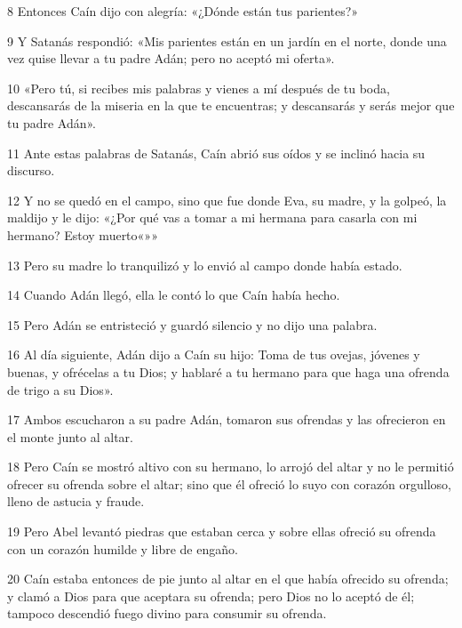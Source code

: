 \par 8 Entonces Caín dijo con alegría: «¿Dónde están tus parientes?»

\par 9 Y Satanás respondió: «Mis parientes están en un jardín en el norte, donde una vez quise llevar a tu padre Adán; pero no aceptó mi oferta».

\par 10 «Pero tú, si recibes mis palabras y vienes a mí después de tu boda, descansarás de la miseria en la que te encuentras; y descansarás y serás mejor que tu padre Adán».

\par 11 Ante estas palabras de Satanás, Caín abrió sus oídos y se inclinó hacia su discurso.

\par 12 Y no se quedó en el campo, sino que fue donde Eva, su madre, y la golpeó, la maldijo y le dijo: «¿Por qué vas a tomar a mi hermana para casarla con mi hermano? Estoy muerto«»»

\par 13 Pero su madre lo tranquilizó y lo envió al campo donde había estado.

\par 14 Cuando Adán llegó, ella le contó lo que Caín había hecho.

\par 15 Pero Adán se entristeció y guardó silencio y no dijo una palabra.

\par 16 Al día siguiente, Adán dijo a Caín su hijo: Toma de tus ovejas, jóvenes y buenas, y ofrécelas a tu Dios; y hablaré a tu hermano para que haga una ofrenda de trigo a su Dios».

\par 17 Ambos escucharon a su padre Adán, tomaron sus ofrendas y las ofrecieron en el monte junto al altar.

\par 18 Pero Caín se mostró altivo con su hermano, lo arrojó del altar y no le permitió ofrecer su ofrenda sobre el altar; sino que él ofreció lo suyo con corazón orgulloso, lleno de astucia y fraude.

\par 19 Pero Abel levantó piedras que estaban cerca y sobre ellas ofreció su ofrenda con un corazón humilde y libre de engaño.

\par 20 Caín estaba entonces de pie junto al altar en el que había ofrecido su ofrenda; y clamó a Dios para que aceptara su ofrenda; pero Dios no lo aceptó de él; tampoco descendió fuego divino para consumir su ofrenda.

